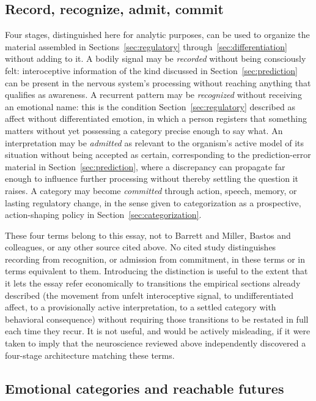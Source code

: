 \documentclass[11pt]{article}
\begin{document}
\subsection{Record, recognize, admit, commit}

Four stages, distinguished here for analytic purposes, can be used to organize the material assembled in Sections~\ref{sec:regulatory} through~\ref{sec:differentiation} without adding to it. A bodily signal may be \emph{recorded} without being consciously felt: interoceptive information of the kind discussed in Section~\ref{sec:prediction} can be present in the nervous system's processing without reaching anything that qualifies as awareness. A recurrent pattern may be \emph{recognized} without receiving an emotional name: this is the condition Section~\ref{sec:regulatory} described as affect without differentiated emotion, in which a person registers that something matters without yet possessing a category precise enough to say what. An interpretation may be \emph{admitted} as relevant to the organism's active model of its situation without being accepted as certain, corresponding to the prediction-error material in Section~\ref{sec:prediction}, where a discrepancy can propagate far enough to influence further processing without thereby settling the question it raises. A category may become \emph{committed} through action, speech, memory, or lasting regulatory change, in the sense given to categorization as a prospective, action-shaping policy in Section~\ref{sec:categorization}.

These four terms belong to this essay, not to Barrett and Miller, Bastos and colleagues, or any other source cited above. No cited study distinguishes recording from recognition, or admission from commitment, in these terms or in terms equivalent to them. Introducing the distinction is useful to the extent that it lets the essay refer economically to transitions the empirical sections already described (the movement from unfelt interoceptive signal, to undifferentiated affect, to a provisionally active interpretation, to a settled category with behavioral consequence) without requiring those transitions to be restated in full each time they recur. It is not useful, and would be actively misleading, if it were taken to imply that the neuroscience reviewed above independently discovered a four-stage architecture matching these terms.

\subsection{Emotional categories and reachable futures}
\end{document}
